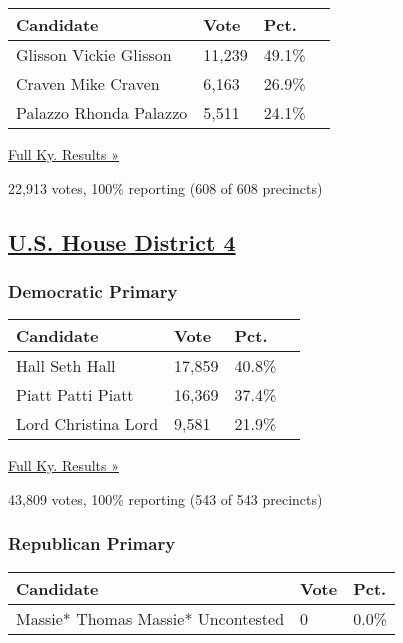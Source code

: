 \begin{longtable}[]{@{}llll@{}}
\toprule
Candidate & Vote & Pct. &\tabularnewline
\midrule
\endhead
 Glisson Vickie Glisson & 11,239 & 49.1\% &\tabularnewline
 Craven Mike Craven & 6,163 & 26.9\% &\tabularnewline
 Palazzo Rhonda Palazzo & 5,511 & 24.1\% &\tabularnewline
\bottomrule
\end{longtable}

\href{https://www.nytimes3xbfgragh.onion/elections/results/kentucky}{Full
Ky. Results »}

22,913 votes, 100\% reporting (608 of 608 precincts)

\hypertarget{us-house-district-4}{%
\subsection{\texorpdfstring{\href{https://www.nytimes3xbfgragh.onion/elections/results/kentucky-house-district-4-primary-election}{U.S.
House District 4}}{U.S. House District 4}}\label{us-house-district-4}}

\hypertarget{democratic-primary-3}{%
\subsubsection{Democratic Primary}\label{democratic-primary-3}}

\begin{longtable}[]{@{}llll@{}}
\toprule
Candidate & Vote & Pct. &\tabularnewline
\midrule
\endhead
 Hall Seth Hall & 17,859 & 40.8\% &\tabularnewline
 Piatt Patti Piatt & 16,369 & 37.4\% &\tabularnewline
 Lord Christina Lord & 9,581 & 21.9\% &\tabularnewline
\bottomrule
\end{longtable}

\href{https://www.nytimes3xbfgragh.onion/elections/results/kentucky}{Full
Ky. Results »}

43,809 votes, 100\% reporting (543 of 543 precincts)

\hypertarget{republican-primary-3}{%
\subsubsection{Republican Primary}\label{republican-primary-3}}

\begin{longtable}[]{@{}lll@{}}
\toprule
Candidate & Vote & Pct.\tabularnewline
\midrule
\endhead
 Massie* Thomas Massie* Uncontested & 0 & 0.0\%\tabularnewline
\bottomrule
\end{longtable}

